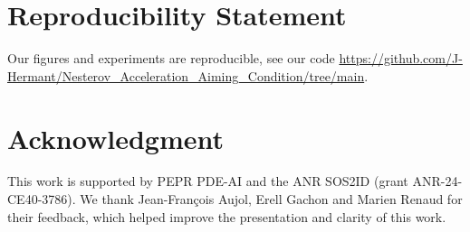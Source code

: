 \documentclass{article}
\theoremstyle{plain}
\theoremstyle{definition}
\theoremstyle{remark}
\begin{document}
\section*{Reproducibility Statement}
Our figures and experiments are reproducible, see our code \url{https://github.com/J-Hermant/Nesterov_Acceleration_Aiming_Condition/tree/main}.
\section*{Acknowledgment}
This work is supported by PEPR PDE-AI and the ANR SOS2ID (grant ANR-24-CE40-3786). We thank Jean-François Aujol, Erell Gachon and Marien Renaud for their feedback, which helped improve the presentation and clarity of this work. 


\end{document}
